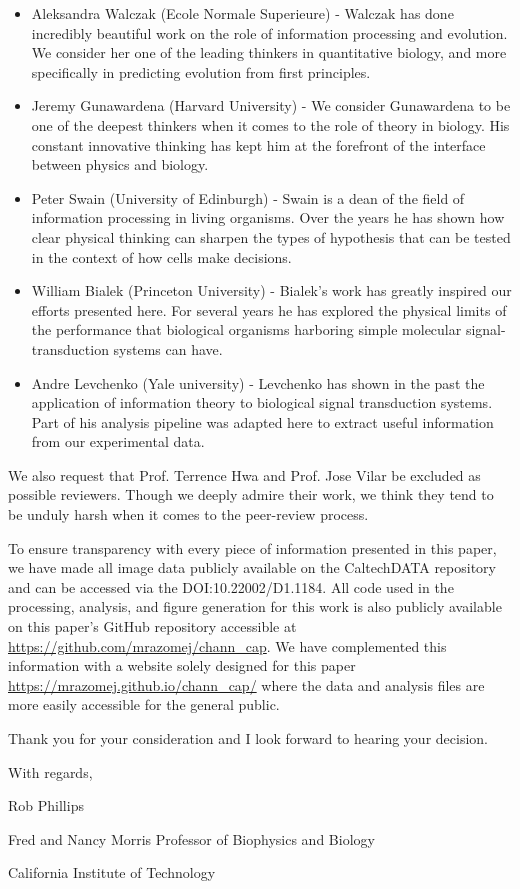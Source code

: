 \begin{itemize}
	\item Aleksandra Walczak (Ecole Normale Superieure) - Walczak has done
	incredibly beautiful work on the role of information processing and
	evolution. We consider her one of the leading thinkers in quantitative
	biology, and more specifically in predicting evolution from first principles.
	\item Jeremy Gunawardena (Harvard University) - We consider Gunawardena to be
	one of the deepest thinkers when it comes to the role of theory in biology.
	His constant innovative thinking has kept him at the forefront of the
	interface between physics and biology.
	\item Peter Swain (University of Edinburgh) - Swain is a dean of the field of
	information processing in living organisms. Over the years he has shown how
	clear physical thinking can sharpen the types of hypothesis that can be tested
	in the context of how cells make decisions.
	\item William Bialek (Princeton University) - Bialek's work has greatly
	inspired our efforts presented here. For several years he has explored the
	physical limits of the performance that biological organisms harboring simple
	molecular signal-transduction systems can have.
	\item Andre Levchenko (Yale university) - Levchenko has shown in the past the
	application of information theory to biological signal transduction systems.
	Part of his analysis pipeline was adapted here to extract useful information
	from our experimental data.
\end{itemize}

We also request that Prof. Terrence Hwa and Prof. Jose Vilar be excluded as
possible reviewers. Though we deeply admire their work, we think they tend to be
unduly harsh when it comes to the peer-review process.

To ensure transparency with every piece of information presented in this paper,
we have made all image data publicly available on the CaltechDATA repository and
can be accessed via the DOI:10.22002/D1.1184. All code used in the processing,
analysis, and figure generation for this work is also publicly available on this
paper's GitHub repository accessible at
\url{https://github.com/mrazomej/chann_cap}. We have complemented this
information with a website solely designed for this paper
\url{https://mrazomej.github.io/chann_cap/} where the data and analysis files
are more easily accessible for the general public.

Thank you for your consideration and I look forward to hearing your decision.

\noindent
With regards,

\noindent
Rob Phillips

\noindent
Fred and Nancy Morris Professor of Biophysics and Biology

\noindent
California Institute of Technology


